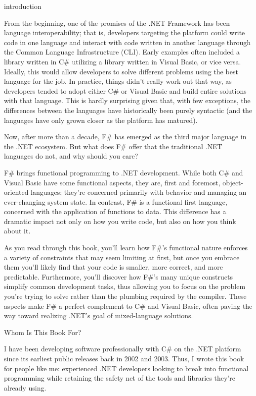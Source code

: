 \documentclass{book}
\begin{document}
introduction

From the beginning, one of the promises of the .NET Framework has been language interoperability; that is, developers targeting the platform could write code in one language and interact with code written in another language through the Common Language Infrastructure (CLI). Early examples often included a library written in C\# utilizing a library written in Visual Basic, or vice versa. Ideally, this would allow developers to solve different problems using the best language for the job. In practice, things didn’t really work out that way, as developers tended to adopt either C\# or Visual Basic and build entire solutions with that language. This is hardly surprising given that, with few exceptions, the differences between the languages have historically been purely syntactic (and the languages have only grown closer as the platform has matured).

Now, after more than a decade, F\# has emerged as the third major language in the .NET ecosystem. But what does F\# offer that the traditional .NET languages do not, and why should you care?

F\# brings functional programming to .NET development. While both C\# and Visual Basic have some functional aspects, they are, first and foremost, object-oriented languages; they’re concerned primarily with behavior and managing an ever-changing system state. In contrast, F\# is a functional first language, concerned with the application of functions to data. This difference has a dramatic impact not only on how you write code, but also on how you think about it.

As you read through this book, you’ll learn how F\#’s functional nature enforces a variety of constraints that may seem limiting at first, but once you embrace them you’ll likely find that your code is smaller, more correct, and more predictable. Furthermore, you’ll discover how F\#’s many unique constructs simplify common development tasks, thus allowing you to focus on the problem you’re trying to solve rather than the plumbing required by the compiler. These aspects make F\# a perfect complement to C\# and Visual Basic, often paving the way toward realizing .NET’s goal of mixed-language solutions.

Whom Is This Book For?

I have been developing software professionally with C\# on the .NET platform since its earliest public releases back in 2002 and 2003. Thus, I wrote this book for people like me: experienced .NET developers looking to break into functional programming while retaining the safety net of the tools and libraries they’re already using.
\end{document}
